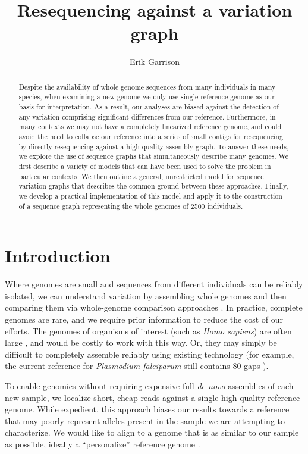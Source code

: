 \documentclass{article}
\begin{document}
\title{Resequencing against a variation graph}

\author{Erik Garrison}

\maketitle

\begin{abstract}
Despite the availability of whole genome sequences from many individuals in many species, when examining a new genome we only use single reference genome as our basis for interpretation.
As a result, our analyses are biased against the detection of any variation comprising significant differences from our reference.
Furthermore, in many contexts we may not have a completely linearized reference genome, and could avoid the need to collapse our reference into a series of small contigs for resequencing by directly resequencing against a high-quality assembly graph.
To answer these needs, we explore the use of sequence graphs that simultaneously describe many genomes.
We first describe a variety of models that can have been used to solve the problem in particular contexts.
We then outline a general, unrestricted model for sequence variation graphs that describes the common ground between these approaches.
Finally, we develop a practical implementation of this model and apply it to the construction of a sequence graph representing the whole genomes of 2500 individuals.
\end{abstract}

\section{Introduction}

Where genomes are small and sequences from different individuals can be reliably isolated, we can understand variation by assembling whole genomes and then comparing them via whole-genome comparison approaches \cite{mummer}.
In practice, complete genomes are rare, and we require prior information to reduce the cost of our efforts.
The genomes of organisms of interest (such as \emph{Homo sapiens}) are often large \cite{pmid11237011}, and would be costly to work with this way.
Or, they may simply be difficult to completely assemble reliably using existing technology (for example, the current reference for \emph{Plasmodium falciparum} still contains 80 gaps \cite{pfalciparum, pfalciparumweb}).

To enable genomics without requiring expensive full \emph{de novo} assemblies of each new sample, we localize short, cheap reads against a single high-quality reference genome.
While expedient, this approach biases our results towards a reference that may poorly-represent alleles present in the sample we are attempting to characterize.
We would like to align to a genome that is as similar to our sample as possible, ideally a ``personalize'' reference genome \cite{Yuan_2012}.
\end{document}
